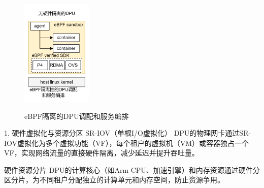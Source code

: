 \captionsetup[figure]{justification=justified}
\begin{figure}
	\centering
		\includegraphics[width=0.3\textwidth]{figures/figure3}
 \label{fig:diagram}
 \caption{eBPF隔离的DPU调配和服务编排}
 
\end{figure}

1. 硬件虚拟化与资源分区
SR-IOV（单根I/O虚拟化）
DPU的物理网卡通过SR-IOV虚拟化为多个虚拟功能（VF），每个租户的虚拟机（VM）或容器独占一个VF，实现网络流量的直接硬件隔离，减少延迟并提升吞吐量。

硬件资源分片
DPU的计算核心（如Arm CPU、加速引擎）和内存资源通过硬件分区分片，为不同租户分配独立的计算单元和内存空间，防止资源争用。